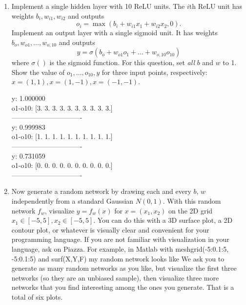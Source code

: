 \documentclass[a4paper]{article}
\theoremstyle{definition}
\newenvironment{soln}{
    \leavevmode\color{blue}\ignorespaces
}{}
\begin{document}
\begin{enumerate}
\item Implement a single hidden layer with 10 ReLU units.
The $i$th ReLU unit has weights $b_i, w_{i1}, w_{i2}$ and outputs 
$$o_i =\max( b_i + w_{i1} x_1 + w_{i2} x_2, 0).$$
Implement an output layer with a single sigmoid unit.
It has weights $b_o, w_{o1}, \ldots, w_{o,10}$ and outputs
$$y =\sigma( b_o + w_{o1} o_1 + \ldots + w_{o,10} o_{10})$$
where $\sigma()$ is the sigmoid function.
For this question, set \emph{all} $b$ and $w$ to 1.
Show the value of $o_1, \ldots, o_{10}, y$ for three input points, respectively: $x=(1,1), x=(1, -1), x=(-1,-1)$.

\begin{soln}
y: 1.000000\\
o1-o10:  [3. 3. 3. 3. 3. 3. 3. 3. 3. 3.]\\
-------------------------------\\
y: 0.999983\\
o1-o10:  [1. 1. 1. 1. 1. 1. 1. 1. 1. 1.]\\
-------------------------------\\
y: 0.731059\\
o1-o10:  [0. 0. 0. 0. 0. 0. 0. 0. 0. 0.]\\
-------------------------------

\end{soln}

\item Now generate a random network by drawing each and every $b$, $w$ independently from a standard Gaussian $N(0,1)$.
With this random network $f_w$, visualize $y=f_w(x)$ for $x=(x_1,x_2)$ on the 2D grid $x_1 \in [-5,5], x_2 \in [-5, 5]$.
You can do this with a 3D surface plot, a 2D contour plot, or whatever is visually clear and convenient for your programming language.
If you are not familiar with visualization in your language, ask on Piazza.
For example, in Matlab with meshgrid(-5:0.1:5, -5:0.1:5) and surf(X,Y,F) my random network looks like
We ask you to generate as many random networks as you like, but visualize the first three networks (so they are an unbiased sample), then visualize three more networks that you find interesting among the ones you generate.
That is a total of six plots.


\end{enumerate}
\end{document}

